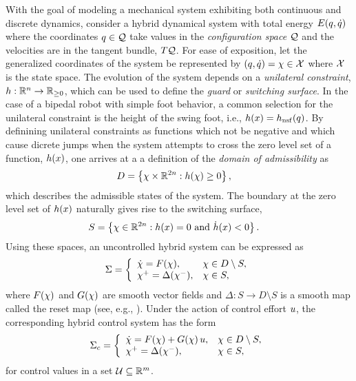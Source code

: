 With the goal of modeling a mechanical system exhibiting both continuous and discrete dynamics, consider a hybrid dynamical system with total energy $E(q, \dot{q})$ where the coordinates $q \in \mathcal{Q}$ take values in the {\em configuration space} $\mathcal{Q}$ and the velocities are in the tangent bundle, $T\mathcal{Q}$.
%
For ease of exposition, let the generalized coordinates of the system be represented by $(q, \dot{q}) = \chi \in \mathcal{X}$ where $\mathcal{X}$ is the state space.
%
The evolution of the system depends on a {\em unilateral constraint}, $h : \mathbb{R}^{n} \to \mathbb{R}_{\geq 0}$, which can be used to define the {\em guard} or {\em switching surface}.
%
In the case of a bipedal robot with simple foot behavior, a common selection for the unilateral constraint is the height of the swing foot, i.e., $h(x) = h_{\mathrm{nsf}}(q)$.
%
By definining unilateral constraints as functions which not be negative and which cause dicrete jumps when the system attempts to cross the zero level set of a function, $h(x)$, one arrives at a a definition of the {\em domain of admissibility} as
%
\begin{align}
  \label{eq:domain}
  D &= \left\{ \chi \times \mathbb{R}^{2n} : h(\chi) \geq 0 \right\},
\end{align}
%
which describes the admissible states of the system.
%
The boundary at the zero level set of $h(x)$ naturally gives rise to the switching surface,
%
\begin{align}
  \label{eq:guard}
  S &= \left\{ \chi \in \mathbb{R}^{2n} : h(x) = 0 \mbox{ and } {\dot h}(x) < 0 \right\}.
\end{align}
%
Using these spaces, an uncontrolled hybrid system can be expressed as
%
\begin{align}
  \Sigma = \left\{
  \begin{array}{l l}
    {\dot {\chi}} = F(\chi), & \chi \in D \setminus S,\\
    \chi^{+} = \Delta(\chi^{-}), & \chi \in S,
  \end{array}\right.
  \label{eq:hsys}
\end{align}
%
where $F(\chi)$ and $G(\chi)$ are smooth vector fields and $\Delta : S \to D \setminus S$ is a smooth map called the reset map (see, e.g., \cite{Morris2005}).
%
Under the action of control effort $u$, the corresponding hybrid control system has the form
%
\begin{align}
  \Sigma_{c} = \left\{
  \begin{array}{l l}
    {\dot {\chi}} = F(\chi) + G(\chi) \, u, & \chi \in D \setminus S,\\
    \chi^{+} = \Delta(\chi^{-}), & \chi \in S,
  \end{array}\right.
  \label{eq:hcsys}
\end{align}
%
for control values in a set $\mathcal{U} \subseteq \mathbb{R}^{m}$.
%


